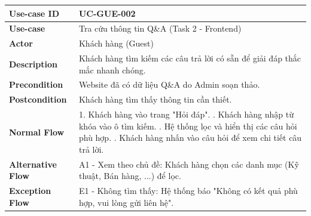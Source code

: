 \begin{table}[H]
\centering
\renewcommand{\arraystretch}{1.2}
\begin{tabular}{|p{3.5cm}|p{9.5cm}|}
\hline
\textbf{Use-case ID} & UC-GUE-002 \\ \hline
\textbf{Use-case} & Tra cứu thông tin Q\&A (Task 2 - Frontend) \\ \hline
\textbf{Actor} & Khách hàng (Guest) \\ \hline
\textbf{Description} & Khách hàng tìm kiếm các câu trả lời có sẵn để giải đáp thắc mắc nhanh chóng. \\ \hline
\textbf{Precondition} & Website đã có dữ liệu Q\&A do Admin soạn thảo. \\ \hline
\textbf{Postcondition} & Khách hàng tìm thấy thông tin cần thiết. \\ \hline
\textbf{Normal Flow} & 
1. Khách hàng vào trang "Hỏi đáp". \newline
2. Khách hàng nhập từ khóa vào ô tìm kiếm. \newline
3. Hệ thống lọc và hiển thị các câu hỏi phù hợp. \newline
4. Khách hàng nhấn vào câu hỏi để xem chi tiết câu trả lời. \\ \hline
\textbf{Alternative Flow} & A1 - Xem theo chủ đề: Khách hàng chọn các danh mục (Kỹ thuật, Bán hàng, ...) để lọc. \\ \hline
\textbf{Exception Flow} & E1 - Không tìm thấy: Hệ thống báo "Không có kết quả phù hợp, vui lòng gửi liên hệ". \\ \hline
\end{tabular}
\end{table}

